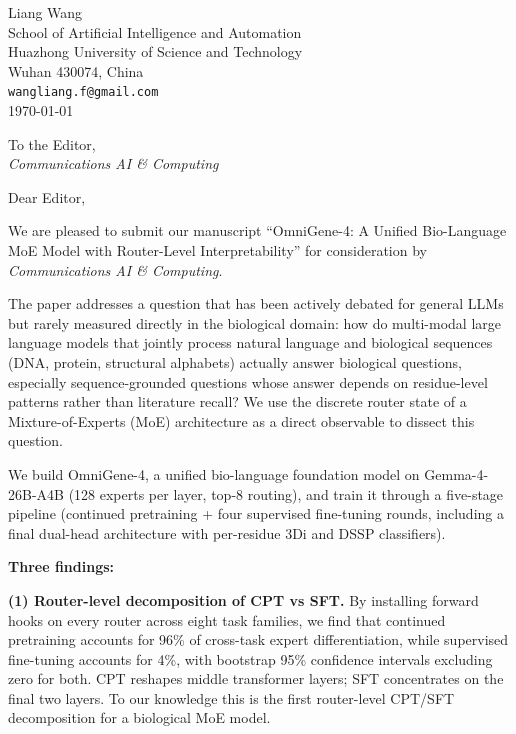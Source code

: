 \documentclass[11pt]{article}
\begin{document}
\begin{flushright}
Liang Wang\\
School of Artificial Intelligence and Automation\\
Huazhong University of Science and Technology\\
Wuhan 430074, China\\
\texttt{wangliang.f@gmail.com}\\
\today
\end{flushright}

\vspace{1em}

To the Editor,\\
\textit{Communications AI \& Computing}

\vspace{1em}

Dear Editor,

We are pleased to submit our manuscript ``OmniGene-4: A Unified Bio-Language MoE Model with Router-Level Interpretability'' for consideration by \textit{Communications AI \& Computing}.

The paper addresses a question that has been actively debated for general LLMs but rarely measured directly in the biological domain: how do multi-modal large language models that jointly process natural language and biological sequences (DNA, protein, structural alphabets) actually answer biological questions, especially sequence-grounded questions whose answer depends on residue-level patterns rather than literature recall? We use the discrete router state of a Mixture-of-Experts (MoE) architecture as a direct observable to dissect this question.

We build OmniGene-4, a unified bio-language foundation model on Gemma-4-26B-A4B (128 experts per layer, top-8 routing), and train it through a five-stage pipeline (continued pretraining + four supervised fine-tuning rounds, including a final dual-head architecture with per-residue 3Di and DSSP classifiers).

\textbf{Three findings:}

\textbf{(1) Router-level decomposition of CPT vs SFT.} By installing forward hooks on every router across eight task families, we find that continued pretraining accounts for 96\% of cross-task expert differentiation, while supervised fine-tuning accounts for 4\%, with bootstrap 95\% confidence intervals excluding zero for both. CPT reshapes middle transformer layers; SFT concentrates on the final two layers. To our knowledge this is the first router-level CPT/SFT decomposition for a biological MoE model.
\end{document}
